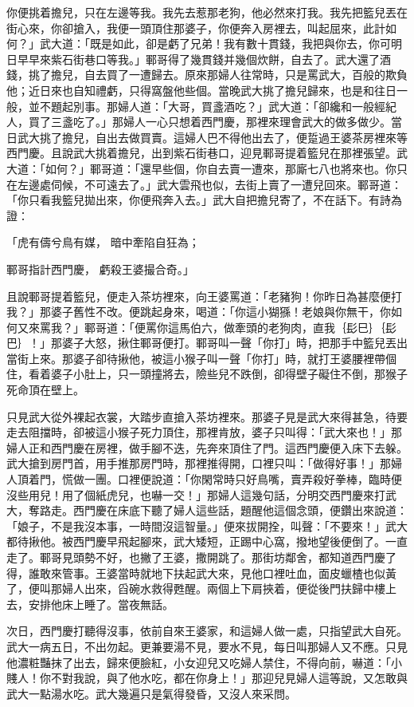 \begin{showcontents}{}
你便挑着擔兒，只在左邊等我。我先去惹那老狗，他必然來打我。我先把籃兒丟在街心來，你卻搶入，我便一頭頂住那婆子，你便奔入房裡去，叫起屈來，此計如何？」武大道：「既是如此，卻是虧了兄弟！我有數十貫錢，我把與你去，你可明日早早來紫石街巷口等我。」鄆哥得了幾貫錢并幾個炊餅，自去了。武大還了酒錢，挑了擔兒，自去買了一遭歸去。原來那婦人往常時，只是罵武大，百般的欺負他；近日來也自知禮虧，只得窩盤他些個。當晚武大挑了擔兒歸來，也是和往日一般，並不題起別事。那婦人道：「大哥，買盞酒吃？」武大道：「卻纔和一般經紀人，買了三盞吃了。」那婦人一心只想着西門慶，那裡來理會武大的做多做少。當日武大挑了擔兒，自出去做買賣。這婦人巴不得他出去了，便踅過王婆茶房裡來等西門慶。且說武大挑着擔兒，出到紫石街巷口，迎見鄆哥提着籃兒在那裡張望。武大道：「如何？」鄆哥道：「還早些個，你自去賣一遭來，那廝七八也將來也。你只在左邊處伺候，不可遠去了。」武大雲飛也似，去街上賣了一遭兒回來。鄆哥道：「你只看我籃兒拋出來，你便飛奔入去。」武大自把擔兒寄了，不在話下。有詩為證：

「虎有儔兮鳥有媒，  暗中牽陷自狂為；

鄆哥指計西門慶，  虧殺王婆撮合奇。」

且說鄆哥提着籃兒，便走入茶坊裡來，向王婆罵道：「老豬狗！你昨日為甚麼便打我？」那婆子舊性不改。便跳起身來，喝道：「你這小猢猻！老娘與你無干，你如何又來罵我？」鄆哥道：「便罵你這馬伯六，做牽頭的老狗肉，直我｛髟巳｝｛髟巴｝！」那婆子大怒，揪住鄆哥便打。鄆哥叫一聲「你打」時，把那手中籃兒丟出當街上來。那婆子卻待揪他，被這小猴子叫一聲「你打」時，就打王婆腰裡帶個住，看着婆子小肚上，只一頭撞將去，險些兒不跌倒，卻得壁子礙住不倒，那猴子死命頂在壁上。

只見武大從外裸起衣裳，大踏步直搶入茶坊裡來。那婆子見是武大來得甚急，待要走去阻擋時，卻被這小猴子死力頂住，那裡肯放，婆子只叫得：「武大來也！」那婦人正和西門慶在房裡，做手腳不迭，先奔來頂住了門。這西門慶便入床下去躲。武大搶到房門首，用手推那房門時，那裡推得開，口裡只叫：「做得好事！」那婦人頂着門，慌做一團。口裡便說道：「你閑常時只好鳥嘴，賣弄殺好拳棒，臨時便沒些用兒！用了個紙虎兒，也嚇一交！」那婦人這幾句話，分明交西門慶來打武大，奪路走。西門慶在床底下聽了婦人這些話，題醒他這個念頭，便鑽出來說道：「娘子，不是我沒本事，一時間沒這智量。」便來拔開拴，叫聲：「不要來！」武大都待揪他。被西門慶早飛起腳來，武大矮短，正踢中心窩，撥地望後便倒了。一直走了。鄆哥見頭勢不好，也撇了王婆，撒開跳了。那街坊鄰舍，都知道西門慶了得，誰敢來管事。王婆當時就地下扶起武大來，見他口裡吐血，面皮蠟楂也似黃了，便叫那婦人出來，舀碗水救得甦醒。兩個上下肩挾着，便從後門扶歸中樓上去，安排他床上睡了。當夜無話。

次日，西門慶打聽得沒事，依前自來王婆家，和這婦人做一處，只指望武大自死。武大一病五日，不出勿起。更兼要湯不見，要水不見，每日叫那婦人又不應。只見他濃粧豔抹了出去，歸來便臉紅，小女迎兒又吃婦人禁住，不得向前，嚇道：「小賤人！你不對我說，與了他水吃，都在你身上！」那迎兒見婦人這等說，又怎敢與武大一點湯水吃。武大幾遍只是氣得發昏，又沒人來采問。


\end{showcontents}

